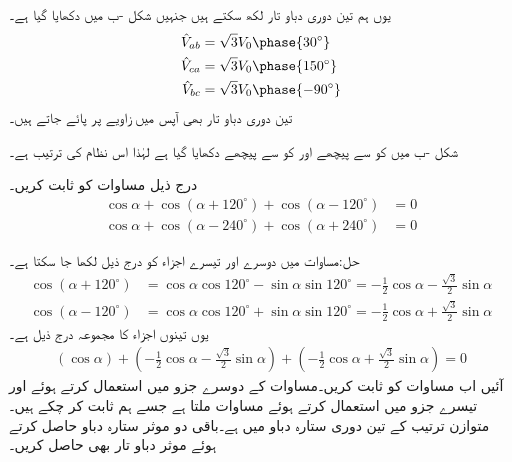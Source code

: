 یوں ہم تین دوری دباو تار لکھ سکتے ہیں جنہیں شکل -ب میں دکھایا گیا ہے۔
\begin{gather}
\begin{aligned}
\hat{V}_{ab}&=\sqrt{3}V_0\phase{30^{\circ}}\\
\hat{V}_{ca}&=\sqrt{3}V_0\phase{150^{\circ}}\\
\hat{V}_{bc}&=\sqrt{3}V_0\phase{-90^{\circ}}
\end{aligned}
\end{gather}
تین دوری دباو تار بھی آپس میں  زاویے پر پائے جاتے ہیں۔

شکل -ب میں   کو  سے  پیچھے اور  کو  سے   پیچھے دکھایا گیا ہے لہٰذا اس نظام کی ترتیب  ہے۔

درج ذیل مساوات کو ثابت کریں۔
\begin{align}
\cos \alpha+\cos(\alpha+120^{\circ})+\cos(\alpha-120^{\circ})&=0\label{مساوات_تین_دوری_تکونی_صفر_برابر_ہے}\\
\cos \alpha+\cos(\alpha-240^{\circ})+\cos(\alpha+240^{\circ})&=0\label{مساوات_تین_دوری_تکونی_صفر_برابر_ب}
\end{align}

حل:مساوات  میں دوسرے اور تیسرے اجزاء کو درج ذیل لکھا جا سکتا ہے۔
\begin{align*}
\cos(\alpha+120^{\circ})&=\cos \alpha \cos 120^{\circ}-\sin \alpha \sin 120^{\circ}=-\frac{1}{2}\cos \alpha-\frac{\sqrt{3}}{2}\sin\alpha\\
\cos(\alpha-120^{\circ})&=\cos \alpha \cos 120^{\circ}+\sin \alpha \sin 120^{\circ}=-\frac{1}{2}\cos \alpha+\frac{\sqrt{3}}{2}\sin\alpha
\end{align*}
یوں تینوں اجزاء کا مجموعہ درج ذیل ہے۔
\begin{align*}
(\cos \alpha)+(-\frac{1}{2}\cos \alpha-\frac{\sqrt{3}}{2}\sin\alpha)+(-\frac{1}{2}\cos \alpha+\frac{\sqrt{3}}{2}\sin\alpha)=0
\end{align*}
آئیں اب مساوات  کو ثابت کریں۔مساوات کے دوسرے جزو میں  استعمال کرتے ہوئے اور تیسرے جزو میں  استعمال کرتے ہوئے مساوات  ملتا ہے جسے ہم ثابت کر چکے ہیں۔
متوازن  ترتیب کے تین دوری ستارہ دباو  میں  ہے۔باقی دو موثر ستارہ دباو حاصل کرتے ہوئے موثر دباو تار بھی حاصل کریں۔

